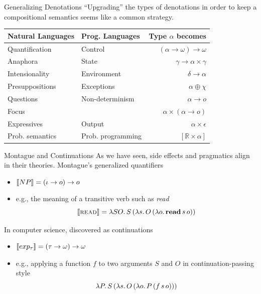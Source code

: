 \documentclass{beamer}
\begin{document}
\begin{frame}{Generalizing Denotations}
  ``Upgrading'' the types of denotations in order to keep a compositional
  semantics seems like a common strategy.
  \vfill
  \begin{tabular}{llr}
    Natural Languages & Prog. Languages & Type $\alpha$ becomes \\
    \hline
    Quantification & Control &
    $(\alpha \to \omega) \to \omega$ \\
    Anaphora & State &
    $\gamma \to \alpha \times \gamma$ \\
    Intensionality & Environment &
    $\delta \to \alpha$ \\
    Presuppositions & Exceptions &
    $\alpha \oplus \chi$ \\
    Questions & Non-determinism &
    $\alpha \to o$ \\
    Focus & &
    $\alpha \times (\alpha \to o)$ \\
    Expressives & Output &
    $\alpha \times \epsilon$ \\
    Prob. semantics & Prob. programming &
    $[\mathbb{R} \times \alpha]$ \\
  \end{tabular}
\end{frame}


\begin{frame}{Montague and Continuations}
  As we have seen, side effects and pragmatics align in their theories.
  \pause
  \vfill
  Montague's generalized quantifiers
  \begin{itemize}
  \item $\llbracket NP \rrbracket = (\iota \to o) \to o$
  \item e.g., the meaning of a transitive verb such as \textit{read}
    $$ \llbracket \textsc{read} \rrbracket = \lambda S O.\, S\,(\lambda s.\, O\,(\lambda o.\, \textbf{read}\,s\,o)) $$
  \end{itemize}
  \vfill
  \pause
  In computer science, discovered as continuations
  \begin{itemize}
  \item $\llbracket exp_{\tau} \rrbracket = (\tau \to \omega) \to \omega$
  \item e.g., applying a function $f$ to two arguments $S$ and $O$ in
    continuation-passing style
    $$\lambda P.\, S\,(\lambda s.\, O\,(\lambda o.\, P\,(f\,s\,o)))$$
  \end{itemize}
\end{frame}
\end{document}
